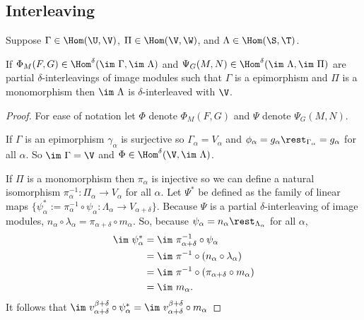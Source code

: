 
\subsection{Interleaving}

\begin{lemma}%
  Suppose $\Gamma\in\Hom(\U,\V)$, $\Pi\in\Hom(\V,\W)$, and $\Lambda\in\Hom(\S, \T)$.

  If $\Phi_M(F, G)\in\Hom^\delta(\im~\Gamma, \im~\Lambda)$ and $\Psi_G(M, N)\in\Hom^\delta(\im~\Lambda, \im~\Pi)$ are partial $\delta$-interleavings of image modules such that $\Gamma$ is a epimorphism and $\Pi$ is a monomorphism then $\im~\Lambda$ is $\delta$-interleaved with $\V$.
\end{lemma}
\begin{proof}
  For ease of notation let $\Phi$ denote $\Phi_M(F, G)$ and $\Psi$ denote $\Psi_G(M, N)$.

  If $\Gamma$ is an epimorphism $\gamma_\alpha$ is surjective so $\Gamma_\alpha = V_\alpha$ and $\phi_{\alpha} = g_{\alpha}\rest_{\Gamma_\alpha} = g_\alpha$ for all $\alpha$.
  So $\im~\Gamma = \V$ and $\Phi\in\Hom^\delta(\V,\im~\Lambda)$.

  If $\Pi$ is a monomorphism then $\pi_\alpha$ is injective so we can define a natural isomorphism $\pi_\alpha^{-1} : \Pi_\alpha\to V_\alpha$ for all $\alpha$.
  Let $\Psi^*$ be defined as the family of linear maps $\{\psi_\alpha^* := \pi^{-1}_\alpha \circ \psi_\alpha : \Lambda_\alpha\to V_{\alpha+\delta}\}$.
  Because $\Psi$ is a partial $\delta$-interleaving of image modules, $n_\alpha\circ\lambda_\alpha = \pi_{\alpha+\delta}\circ m_\alpha$.
  So, because $\psi_\alpha = n_\alpha\rest_{\Lambda_\alpha}$ for all $\alpha$,
  \begin{align*}
    \im~\psi_\alpha^* &= \im~\pi^{-1}_{\alpha+\delta}\circ\psi_\alpha\\
                      &= \im~\pi^{-1}\circ (n_\alpha\circ\lambda_\alpha)\\
                      &= \im~\pi^{-1}\circ (\pi_{\alpha+\delta}\circ m_\alpha)\\
                      &= \im~ m_\alpha.
  \end{align*}
  It follows that $\im~v_{\alpha+\delta}^{\beta+\delta}\circ\psi_\alpha^* = \im~v_{\alpha+\delta}^{\beta+\delta}\circ m_\alpha$


\end{proof}
